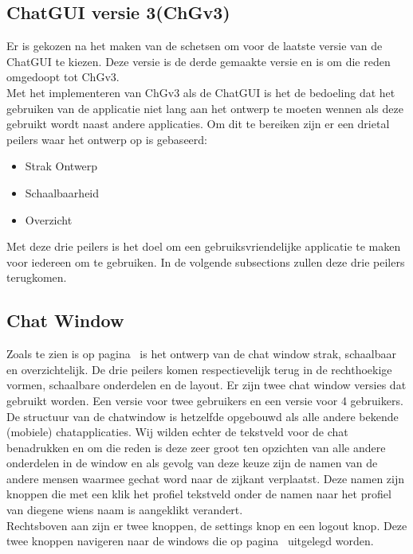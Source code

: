 \documentclass[12pt]{article}
\begin{document}
\subsection{ChatGUI versie 3(ChGv3)}
\label{ChatGUI}
Er is gekozen na het maken van de schetsen om voor de laatste versie van de ChatGUI te kiezen. Deze versie is de derde gemaakte versie en is om die reden omgedoopt tot ChGv3. \\

\noindent Met het implementeren van ChGv3 als de ChatGUI is het de bedoeling dat het gebruiken van de applicatie niet lang aan het ontwerp te moeten wennen als deze gebruikt wordt naast andere applicaties. Om dit te bereiken zijn er een drietal peilers waar het ontwerp op is gebaseerd:
\begin{itemize}
\item{Strak Ontwerp}
\item{Schaalbaarheid}
\item{Overzicht}
\end{itemize}
Met deze drie peilers is het doel om een gebruiksvriendelijke applicatie te maken voor iedereen om te gebruiken. In de volgende subsections zullen deze drie peilers terugkomen.

\subsection*{Chat Window}
\label{Chat Window}
Zoals te zien is op pagina~\pageref{ChGv3Chat} is het ontwerp van de chat window strak, schaalbaar en overzichtelijk. De drie peilers komen respectievelijk terug in de rechthoekige vormen, schaalbare onderdelen en de layout. Er zijn twee chat window versies dat gebruikt worden. Een versie voor twee gebruikers en een versie voor 4 gebruikers.\\

\noindent De structuur van de chatwindow is hetzelfde opgebouwd als alle andere bekende (mobiele) chatapplicaties. Wij wilden echter de tekstveld voor de chat benadrukken en om die reden is deze zeer groot ten opzichten van alle andere onderdelen in de window en als gevolg van deze keuze zijn de namen van de andere mensen waarmee gechat word naar de zijkant verplaatst. Deze namen zijn knoppen die met een klik het profiel tekstveld onder de namen naar het profiel van diegene wiens naam is aangeklikt verandert. \\

\noindent Rechtsboven aan zijn er twee knoppen, de settings knop en een logout knop. Deze twee knoppen navigeren naar de windows die op pagina~\pageref{LWSW} uitgelegd worden.
\end{document}
